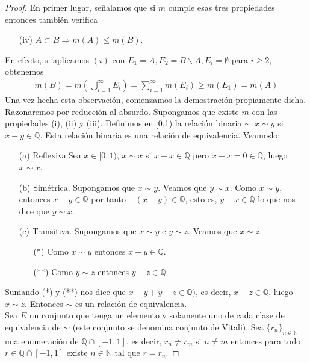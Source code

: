 \begin{proof}
En primer lugar, señalamos que si $m$ cumple esas tres propiedades entonces también verifica
\begin{enumerate}
    \item[(iv)] $A \subset B \Longrightarrow m(A) \leq m(B)$.
\end{enumerate}
En efecto, si aplicamos $(i)$ con $E_1 = A, E_2 = B \backslash A, E_i = \emptyset$ para $i \ge 2$, obtenemos
\begin{align*}
    m(B) = m\left(\bigcup_{i=1}^{\infty}{E_i}\right) = \sum_{i=1}^{\infty}{m(E_i)} \ge m(E_1) = m(A)
\end{align*}
Una vez hecha esta observación, comenzamos la demostración propiamente dicha. Razonaremos por reducción al absurdo. Supongamos que existe $m$ con las propiedades (i), (ii) y (iii). Definimos en [0,1) la relación binaria $\sim: x \sim y$ si $x -y \in \mathbb{Q}$. Esta relación binaria es una relación de equivalencia. Veamoslo:
\begin{enumerate}
    \item[(a)] Reflexiva.Sea $x \in [0,1)$, $x \sim x$ si $x - x \in \mathbb{Q}$ pero $x - x = 0 \in \mathbb{Q}$, luego $x \sim x$.
    \item[(b)] Simétrica. Supongamos que $x \sim y$. Veamos que $y \sim x$. Como $x \sim y$, entonces $x - y \in \mathbb{Q}$ por tanto $-(x-y) \in \mathbb{Q}$, esto es, $y - x \in \mathbb{Q}$ lo que nos dice que $y \sim x$.
    \item[(c)] Transitiva. Supongamos que $x \sim y$ e $y \sim z$. Veamos que $x \sim z$. 
    \begin{enumerate}
        \item[(*)] Como $x \sim y$ entonces $x - y \in \mathbb{Q}$.
        \item[(**)] Como $y \sim z$ entonces $y - z \in \mathbb{Q}$.
    \end{enumerate}
\end{enumerate}
Sumando (*) y (**) nos dice que $x - y + y - z \in \mathbb{Q})$, es decir, $x - z \in \mathbb{Q}$, luego $x \sim z$. Entonces $\sim$ es un relación de equivalencia.
\\
\newline
Sea $E$ un conjunto que tenga un elemento y solamente uno de cada clase de equivalencia de $\sim$ (este conjunto se denomina conjunto de Vitali). Sea $\{r_n\}_{n \in \mathbb{N}}$ una enumeración de $\mathbb{Q} \cap [-1,1]$, es decir, $r_n \not = r_m$ si $n \not = m$ entonces para todo $r \in \mathbb{Q} \cap [-1,1]$ existe $n \in \mathbb{N}$ tal que $r = r_n$.

\end{proof}
